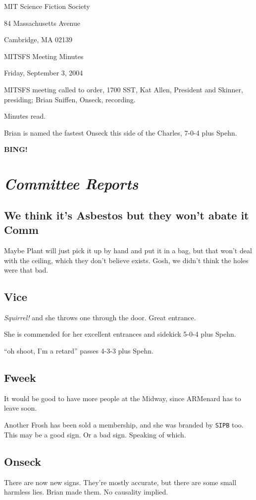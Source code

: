\documentclass[10pt]{article}
\newcommand{\bing}{{\bf BING!} }
\newcommand{\goto}[1]{\bing \vskip 12pt \section*{{\em{#1}}}}
\newcommand{\ps}{ plus Spehn\xspace}
\begin{document}
\begin{center}

MIT Science Fiction Society 

84 Massachusetts Avenue

Cambridge, MA 02139

\vspace{12pt}

MITSFS Meeting Minutes 

Friday, September 3, 2004

\end{center}
 
\vspace{18pt}

\setlength{\parskip}{6pt}

\noindent
MITSFS meeting called to order, 1700 SST, Kat Allen, President and
Skinner, presiding; Brian Sniffen,  Onseck, recording.

Minutes read.

Brian is named the fastest Onseck this side of the Charles, 7-0-4\ps.

\goto{Committee Reports}
\subsection*{We think it's Asbestos but they won't abate it Comm}
Maybe Plant will just pick it up by hand and put it in a bag, but
that won't deal with the ceiling, which they don't believe exists.
Gosh, we didn't think the holes were that bad.

\subsection*{Vice}
\emph{Squirrel!} and she throws one through the door.  Great entrance.

She is commended for her excellent entrances and sidekick 5-0-4\ps.

``oh shoot, I'm a retard'' passes 4-3-3\ps.

\subsection*{Fweek}
It would be good to have more people at the Midway, since
\textsf{ARM}enard has to leave soon.

Another Frosh has been sold a membership, and she was branded by
\texttt{SIPB} too.  This may be a good sign.  Or a bad sign.  Speaking
of which.

\subsection*{Onseck}
There are now new signs.  They're mostly accurate, but there are some
small harmless lies.  Brian made them.  No causality implied.
\end{document}
